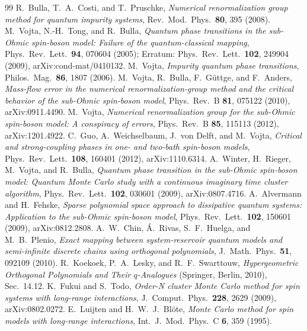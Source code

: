 \begin{thebibliography}{99}
 R.~Bulla, T.~A.~Costi, and T.~Pruschke, \emph{Numerical renormalization group method for quantum impurity
  systems}, Rev.\ Mod.\ Phys.\ \textbf{80}, 395 (2008).
 M.~Vojta, N.-H.~Tong, and R.~Bulla, \emph{Quantum phase transitions in the sub-Ohmic spin-boson model: Failure of
  the quantum-classical mapping}, Phys.\ Rev.\ Lett.\ \textbf{94}, 070604 (2005); Erratum: Phys.\ Rev.\ Lett.\ \textbf{102}, 249904
  (2009), arXiv:cond-mat/0410132.
 M.~Vojta, \emph{Impurity quantum phase transitions}, Philos.\ Mag.\ \textbf{86}, 1807 (2006).
 M.~Vojta, R.~Bulla, F.~G\"uttge, and F.~Anders, \emph{Mass-flow error in the numerical renormalization-group
  method and the critical behavior of the sub-Ohmic spin-boson model}, Phys.\ Rev.\ B \textbf{81}, 075122 (2010), arXiv:0911.4490.
 M.~Vojta, \emph{Numerical renormalization group for the sub-Ohmic spin-boson model: A conspiracy of errors},
  Phys.\ Rev.\ B \textbf{85}, 115113 (2012), arXiv:1201.4922.
 C.~Guo, A.~Weichselbaum, J.~von Delft, and M.~Vojta, \emph{Critical and strong-coupling phases in one- and two-bath
  spin-boson models}, Phys.\ Rev.\ Lett.\ \textbf{108}, 160401 (2012), arXiv:1110.6314.
 A.~Winter, H.~Rieger, M.~Vojta, and R.~Bulla, \emph{Quantum phase transition in the sub-Ohmic spin-boson model:
  Quantum Monte Carlo study with a continuous imaginary time cluster algorithm}, Phys.\ Rev.\ Lett.\ \textbf{102}, 030601 (2009),
  arXiv:0807.4716.
 A.~Alvermann and H.~Fehske, \emph{Sparse polynomial space approach to dissipative quantum systems: Application to the
  sub-Ohmic spin-boson model}, Phys.\ Rev.\ Lett.\ \textbf{102}, 150601 (2009), arXiv:0812.2808.
 A.~W.~Chin, \'A.~Rivas, S.~F.~Huelga, and M.~B.~Plenio, \emph{Exact mapping between system-reservoir quantum models
  and semi-infinite discrete chains using orthogonal polynomials}, J.\ Math.\ Phys.\ \textbf{51}, 092109 (2010).
 R.~Koekoek, P.~A.~Lesky, and R.~F.~Swarttouw, \emph{Hypergeometric Orthogonal Polynomials and Their $q$-Analogues}
  (Springer, Berlin, 2010), Sec.~14.12.
 K.~Fukui and S.~Todo, \emph{Order-N cluster Monte Carlo method for spin systems with long-range interactions},
  J.\ Comput.\ Phys.\ \textbf{228}, 2629 (2009), arXiv:0802.0272.
 E.~Luijten and H.~W.~J.~Bl\"ote, \emph{Monte Carlo method for spin models with long-range interactions}, Int.\ J.\ Mod.\
  Phys.\ C \textbf{6}, 359 (1995).

\end{thebibliography}
